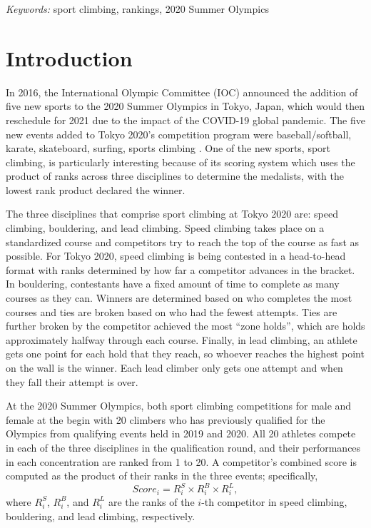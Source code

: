 \documentclass[12pt]{article}
\begin{document}
\noindent%
{\it Keywords:} sport climbing, rankings, 2020 Summer Olympics
\vfill

\newpage
{} %

\hypertarget{introduction}{%
\section{Introduction}\label{introduction}}

In 2016, the International Olympic Committee (IOC) announced the
addition of five new sports to the 2020 Summer Olympics in Tokyo, Japan,
which would then reschedule for 2021 due to the impact of the COVID-19
global pandemic. The five new events added to Tokyo 2020's competition
program were baseball/softball, karate, skateboard, surfing, sports
climbing \citep{ioc2016}. One of the new sports, sport climbing, is
particularly interesting because of its scoring system which uses the
product of ranks across three disciplines to determine the medalists,
with the lowest rank product declared the winner.

The three disciplines that comprise sport climbing at Tokyo 2020 are:
speed climbing, bouldering, and lead climbing. Speed climbing takes
place on a standardized course and competitors try to reach the top of
the course as fast as possible. For Tokyo 2020, speed climbing is being
contested in a head-to-head format with ranks determined by how far a
competitor advances in the bracket. In bouldering, contestants have a
fixed amount of time to complete as many courses as they can. Winners
are determined based on who completes the most courses and ties are
broken based on who had the fewest attempts. Ties are further broken by
the competitor achieved the most ``zone holds'', which are holds
approximately halfway through each course. Finally, in lead climbing, an
athlete gets one point for each hold that they reach, so whoever reaches
the highest point on the wall is the winner. Each lead climber only gets
one attempt and when they fall their attempt is over.

At the 2020 Summer Olympics, both sport climbing competitions for male
and female at the begin with 20 climbers who has previously qualified
for the Olympics from qualifying events held in 2019 and 2020. All 20
athletes compete in each of the three disciplines in the qualification
round, and their performances in each concentration are ranked from 1 to
20. A competitor's combined score is computed as the product of their
ranks in the three events; specifically, \begin{equation}
Score_i = R^S_i\times R^B_i\times R^L_i,
\end{equation} where \(R^S_i\), \(R^B_i\), and \(R^L_i\) are the ranks
of the \(i\)-th competitor in speed climbing, bouldering, and lead
climbing, respectively.
\end{document}

